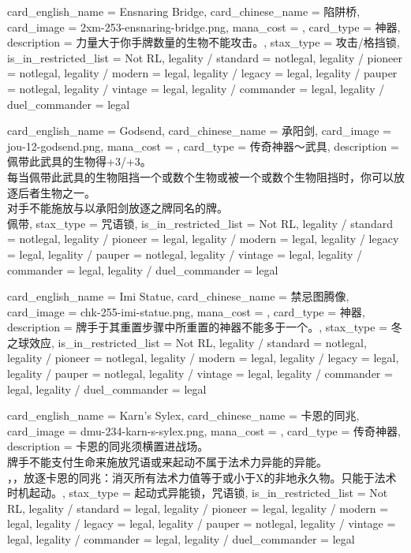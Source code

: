 \documentclass[lang = cn, color = black, 10pt]{AllThatStax}
\begin{document}
\card
{
	card_english_name = {Ensnaring Bridge},
	card_chinese_name = {陷阱桥},
	card_image = 2xm-253-ensnaring-bridge.png,
	mana_cost = ,
	card_type = 神器,
	description = {力量大于你手牌数量的生物不能攻击。},
	stax_type = 攻击/格挡锁,
	is_in_restricted_list = Not RL,
	legality / standard = notlegal,
	legality / pioneer = notlegal,
	legality / modern = legal,
	legality / legacy = legal,
	legality / pauper = notlegal,
	legality / vintage = legal,
	legality / commander = legal,
	legality / duel_commander = legal
}

\card
{
	card_english_name = {Godsend},
	card_chinese_name = {承阳剑},
	card_image = jou-12-godsend.png,
	mana_cost = ,
	card_type = 传奇神器～武具,
	description = {佩带此武具的生物得+3/+3。\\
每当佩带此武具的生物阻挡一个或数个生物或被一个或数个生物阻挡时，你可以放逐后者生物之一。\\
对手不能施放与以承阳剑放逐之牌同名的牌。\\
佩带},
	stax_type = 咒语锁,
	is_in_restricted_list = Not RL,
	legality / standard = notlegal,
	legality / pioneer = legal,
	legality / modern = legal,
	legality / legacy = legal,
	legality / pauper = notlegal,
	legality / vintage = legal,
	legality / commander = legal,
	legality / duel_commander = legal
}

\card
{
	card_english_name = {Imi Statue},
	card_chinese_name = {禁忌图腾像},
	card_image = chk-255-imi-statue.png,
	mana_cost = ,
	card_type = 神器,
	description = {牌手于其重置步骤中所重置的神器不能多于一个。},
	stax_type = 冬之球效应,
	is_in_restricted_list = Not RL,
	legality / standard = notlegal,
	legality / pioneer = notlegal,
	legality / modern = legal,
	legality / legacy = legal,
	legality / pauper = notlegal,
	legality / vintage = legal,
	legality / commander = legal,
	legality / duel_commander = legal
}

\card
{
	card_english_name = {Karn's Sylex},
	card_chinese_name = {卡恩的同兆},
	card_image = dmu-234-karn-s-sylex.png,
	mana_cost = ,
	card_type = 传奇神器,
	description = {卡恩的同兆须横置进战场。\\
牌手不能支付生命来施放咒语或来起动不属于法术力异能的异能。\\
，，放逐卡恩的同兆：消灭所有法术力值等于或小于X的非地永久物。只能于法术时机起动。},
	stax_type = 起动式异能锁，咒语锁,
	is_in_restricted_list = Not RL,
	legality / standard = legal,
	legality / pioneer = legal,
	legality / modern = legal,
	legality / legacy = legal,
	legality / pauper = notlegal,
	legality / vintage = legal,
	legality / commander = legal,
	legality / duel_commander = legal
}
\end{document}
